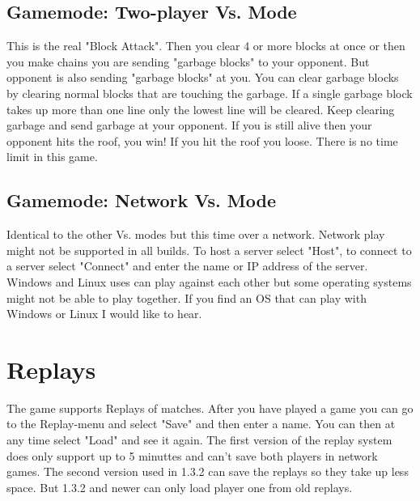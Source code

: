 \documentclass[11pt,a4paper]{article}
\begin{document}
\subsection{Gamemode: Two-player Vs. Mode}
This is the real "Block Attack". Then you clear 4 or more blocks
at once or then you make chains you are sending "garbage blocks"
to your opponent. But opponent is also sending "garbage blocks" at
you. You can clear garbage blocks by clearing normal blocks that
are touching the garbage. If a single garbage block takes up more
than one line only the lowest line will be cleared. Keep clearing
garbage and send garbage at your opponent. If you is still alive
then your opponent hits the roof, you win! If you hit the roof you
loose. There is no time limit in this game.
\subsection{Gamemode: Network Vs. Mode}
Identical to the other Vs. modes but this time over a network. Network play might not be supported in all builds.
\newline To host a server select "Host", to connect to a server select "Connect" and enter the name or IP address of the server.
Windows and Linux uses can play against each other but some operating systems might not be able to play together. If you find an OS that can play with Windows or Linux I would like to hear.

\section{Replays}
The game supports Replays of matches. After you have played a game you can go to the Replay-menu and select "Save" and then enter a name. You can then at any time select "Load" and see it again. The first version of the replay system does only support up to 5 minuttes and can't save both players in network games. \newline
The second version used in 1.3.2 can save the replays so they take up less space. But 1.3.2 and newer can only load player one from old replays.
\end{document}
